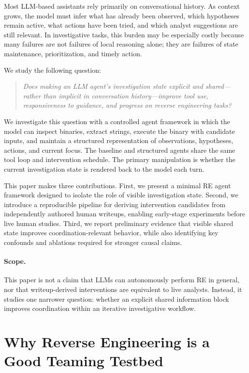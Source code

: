 \documentclass[letterpaper]{article}
\begin{document}
Most LLM-based assistants rely primarily on conversational history.
As context grows, the model must infer what has already been observed, which hypotheses remain active, what actions have been tried, and which analyst suggestions are still relevant.
In investigative tasks, this burden may be especially costly because many failures are not failures of local reasoning alone; they are failures of state maintenance, prioritization, and timely action.

We study the following question:

\begin{quote}
\emph{Does making an LLM agent's investigation state explicit and shared---rather than implicit in conversation history---improve tool use, responsiveness to guidance, and progress on reverse engineering tasks?}
\end{quote}

We investigate this question with a controlled agent framework in which the model can inspect binaries, extract strings, execute the binary with candidate inputs, and maintain a structured representation of observations, hypotheses, actions, and current focus.
The baseline and structured agents share the same tool loop and intervention schedule.
The primary manipulation is whether the current investigation state is rendered back to the model each turn.

This paper makes three contributions.
First, we present a minimal RE agent framework designed to isolate the role of visible investigation state.
Second, we introduce a reproducible pipeline for deriving intervention candidates from independently authored human writeups, enabling early-stage experiments before live human studies.
Third, we report preliminary evidence that visible shared state improves coordination-relevant behavior, while also identifying key confounds and ablations required for stronger causal claims.

\paragraph{Scope.}
This paper is not a claim that LLMs can autonomously perform RE in general, nor that writeup-derived interventions are equivalent to live analysts.
Instead, it studies one narrower question: whether an explicit shared information block improves coordination within an iterative investigative workflow.

\section{Why Reverse Engineering is a Good Teaming Testbed}
\end{document}
